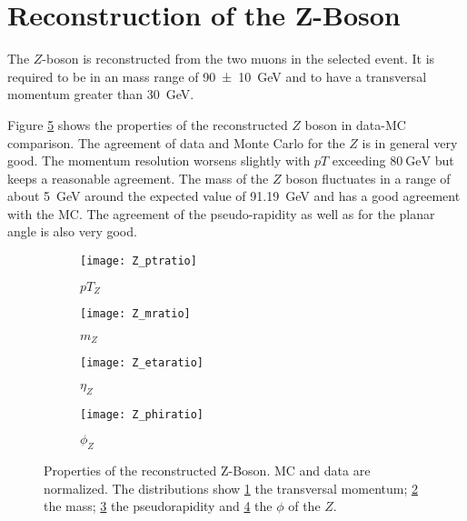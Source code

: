 \section{Reconstruction of the Z-Boson}

The $Z$-boson is reconstructed from the two muons in the selected event.
It is required to be in an mass range of \SI{90+-10}{\GeV} and to have a transversal momentum greater than \SI{30}{\GeV}.

Figure \ref{fig:z} shows the properties of the reconstructed $Z$ boson in data-MC comparison. The agreement of data and Monte Carlo for the $Z$ is in general very good. The momentum resolution worsens slightly with $pT$ exceeding $\SI{80}{\GeV}$ but keeps a reasonable agreement. The mass of the $Z$ boson fluctuates in a range of about \SI{5}{\GeV} around the expected value of \SI{91.19}{\GeV} and has a good agreement with the MC.
The agreement of the pseudo-rapidity as well as for the planar angle is also very good.


\begin{figure}[h]
\centering
\begin{subfigure}[b]{0.5\figwidth}
\texttt{[image: Z\_ptratio]}
\caption[Transversal momentum of the reconstructed Z]{$pT_Z$}
\label{fig:zpt}
\end{subfigure}
\quad
\begin{subfigure}[b]{0.5\figwidth}
\texttt{[image: Z\_mratio]}
\caption[mass of the reconstructed $Z$]{$m_Z$}
\label{fig:zm}
\end{subfigure}


\begin{subfigure}[b]{0.5\figwidth}
\texttt{[image: Z\_etaratio]}
\caption[$\eta$ of the reconstructed $Z$]{$\eta_Z$}
\label{fig:zeta}
\end{subfigure}
\quad
\begin{subfigure}[b]{0.5\figwidth}
\texttt{[image: Z\_phiratio]}
\caption[$\phi$ of the reconstructed $Z$]{$\phi_Z$}
\label{fig:zphi}
\end{subfigure}
\caption{Properties of the reconstructed Z-Boson. MC and data are normalized. The distributions show \ref{fig:zpt} the transversal momentum; \ref{fig:zm} the mass; \ref{fig:zeta} the pseudorapidity and \ref{fig:zphi} the $\phi$ of the $Z$.}
\label{fig:z}
\end{figure}

